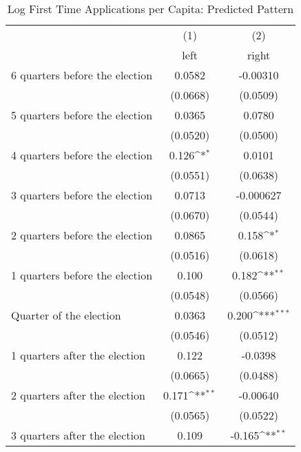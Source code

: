 \begin{table}[htbp]\centering
\def\sym#1{\ifmmode^{#1}\else\(^{#1}\)\fi}
\caption{Log First Time Applications per Capita: Predicted Pattern}
\begin{tabular}{l*{2}{c}}
\hline\hline
                    &\multicolumn{1}{c}{(1)}&\multicolumn{1}{c}{(2)}\\
                    &\multicolumn{1}{c}{left}&\multicolumn{1}{c}{right}\\
\hline
 6 quarters before the election&      0.0582         &    -0.00310         \\
                    &    (0.0668)         &    (0.0509)         \\
[1em]
 5 quarters before the election&      0.0365         &      0.0780         \\
                    &    (0.0520)         &    (0.0500)         \\
[1em]
 4 quarters before the election&       0.126\sym{*}  &      0.0101         \\
                    &    (0.0551)         &    (0.0638)         \\
[1em]
 3 quarters before the election&      0.0713         &   -0.000627         \\
                    &    (0.0670)         &    (0.0544)         \\
[1em]
 2 quarters before the election&      0.0865         &       0.158\sym{*}  \\
                    &    (0.0516)         &    (0.0618)         \\
[1em]
 1 quarters before the election&       0.100         &       0.182\sym{**} \\
                    &    (0.0548)         &    (0.0566)         \\
[1em]
Quarter of the election&      0.0363         &       0.200\sym{***}\\
                    &    (0.0546)         &    (0.0512)         \\
[1em]
 1 quarters after the election&       0.122         &     -0.0398         \\
                    &    (0.0665)         &    (0.0488)         \\
[1em]
 2 quarters after the election&       0.171\sym{**} &    -0.00640         \\
                    &    (0.0565)         &    (0.0522)         \\
[1em]
 3 quarters after the election&       0.109         &      -0.165\sym{**} \\

\end{tabular}
\end{table}
